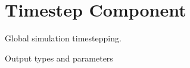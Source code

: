 \section{Timestep Component} \label{s:component-timestep}

Global simulation timestepping.

Output types and parameters

